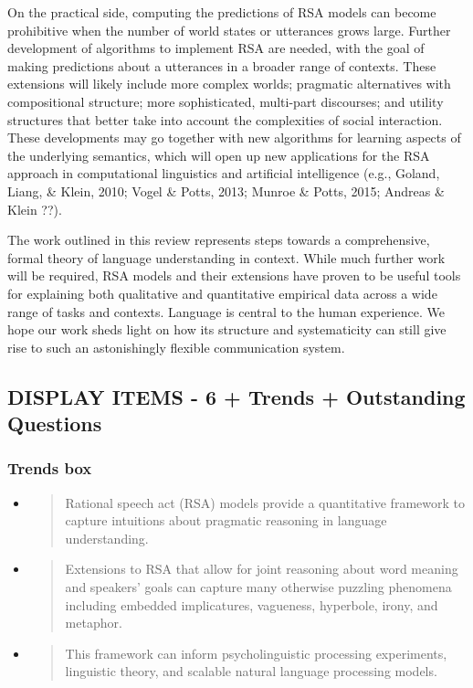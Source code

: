 \documentclass[]{elsarticle}
\begin{document}
On the practical side, computing the predictions of RSA models can
become prohibitive when the number of world states or utterances grows
large. Further development of algorithms to implement RSA are needed,
with the goal of making predictions about a utterances in a broader
range of contexts. These extensions will likely include more complex
worlds; pragmatic alternatives with compositional structure; more
sophisticated, multi-part discourses; and utility structures that better
take into account the complexities of social interaction. These
developments may go together with new algorithms for learning aspects of
the underlying semantics, which will open up new applications for the
RSA approach in computational linguistics and artificial intelligence
(e.g., Goland, Liang, \& Klein, 2010; Vogel \& Potts, 2013; Munroe \&
Potts, 2015; Andreas \& Klein ??).

The work outlined in this review represents steps towards a
comprehensive, formal theory of language understanding in context. While
much further work will be required, RSA models and their extensions have
proven to be useful tools for explaining both qualitative and
quantitative empirical data across a wide range of tasks and contexts.
Language is central to the human experience. We hope our work sheds
light on how its structure and systematicity can still give rise to such
an astonishingly flexible communication system.

\subsection{DISPLAY ITEMS - 6 + Trends + Outstanding
Questions}\label{display-items---6-trends-outstanding-questions}

\subsubsection{Trends box}\label{trends-box}

\begin{itemize}
\item
  \begin{quote}
  Rational speech act (RSA) models provide a quantitative framework to
  capture intuitions about pragmatic reasoning in language
  understanding.
  \end{quote}
\item
  \begin{quote}
  Extensions to RSA that allow for joint reasoning about word meaning
  and speakers' goals can capture many otherwise puzzling phenomena
  including embedded implicatures, vagueness, hyperbole, irony, and
  metaphor.
  \end{quote}
\item
  \begin{quote}
  This framework can inform psycholinguistic processing experiments,
  linguistic theory, and scalable natural language processing models.
  \end{quote}
\end{itemize}
\end{document}
